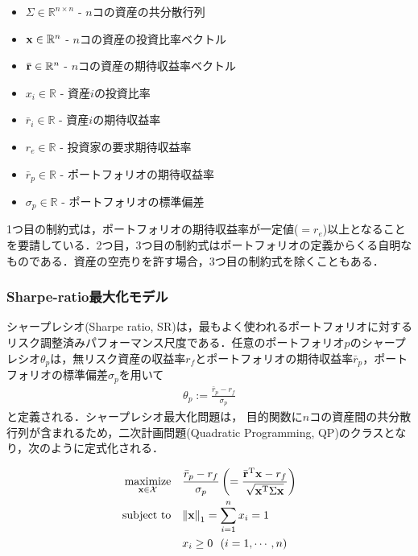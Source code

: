 \documentclass[dvipdfmx,autodetect-engine]{jsarticle}
\begin{document}
\begin{itemize}
    \item $\Sigma \in \mathbb{R}^{n \times n}$ - $n$コの資産の共分散行列
    \item ${\bf x} \in \mathbb{R}^{n}$ - $n$コの資産の投資比率ベクトル
    \item $\bar{\bf r} \in \mathbb{R}^{n}$ - $n$コの資産の期待収益率ベクトル
    \item $x_i \in \mathbb{R}$ - 資産$i$の投資比率
    \item $\bar{r}_i \in \mathbb{R}$ - 資産$i$の期待収益率
    \item $r_e \in \mathbb{R}$ - 投資家の要求期待収益率
    \item $\bar{r}_p \in \mathbb{R}$ - ポートフォリオの期待収益率
    \item $\sigma_p \in \mathbb{R}$ - ポートフォリオの標準偏差
\end{itemize}
1つ目の制約式は，ポートフォリオの期待収益率が一定値($=r_e$)以上となることを要請している．2つ目，3つ目の制約式はポートフォリオの定義からくる自明なものである．資産の空売りを許す場合，3つ目の制約式を除くこともある．

\subsubsection{Sharpe-ratio最大化モデル}

シャープレシオ(Sharpe ratio, SR)は，最もよく使われるポートフォリオに対するリスク調整済みパフォーマンス尺度である．任意のポートフォリオ$p$のシャープレシオ${\theta}_p$は，無リスク資産の収益率$r_f$とポートフォリオの期待収益率$\bar{r}_p$，ポートフォリオの標準偏差$\sigma_p$を用いて
\begin{align}
    {\theta}_p := \frac{\bar{r}_p - r_f}{\sigma_p}
\end{align}
と定義される．シャープレシオ最大化問題は，
目的関数に$n$コの資産間の共分散行列が含まれるため，二次計画問題(Quadratic Programming, QP)のクラスとなり，次のように定式化される．

\begin{align}
    \underset{\bf x \in \mathcal{X}}{\rm maximize} ~~~ 
    &\frac{\bar{r}_p - r_f}{\sigma_p}
    \left( 
    = \frac{\bar{\bf r}^{\mathrm{T}} {\bf x} - r_f}{\sqrt{{\bf x}^{\mathrm{T}} \Sigma {\bf x}}}
    \right) \\
    {\rm subject~to} ~~~ 
    &{\| {\bf x} \|}_{1} = \sum_{i=1}^{n} x_i = 1 \\
    &x_i \geq 0 ~~ (i = 1, \cdots, n)
\end{align}
\end{document}
